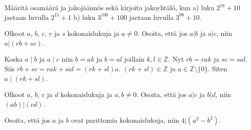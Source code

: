 \begin{tehtavasivu}
\begin{tehtava}
    \begin{vastaus}
    \end{vastaus}
\end{tehtava}

\begin{tehtava}
	Määritä osamäärä ja jakojäännös sekä kirjoita jakoyhtälö, kun a) luku $2^{18} + 10$ jaetaan luvulla $2^{15} + 1$ b) luku $3^{100} + 100$ jaetaan luvulla $3^{98} + 10$.
    \begin{vastaus}
    \end{vastaus}
\end{tehtava}

\begin{tehtava}
	Olkoot $a$, $b$, $c$, $r$ ja $s$ kokonaislukuja ja $a \neq 0$. Osoita, että jos $a|b$ ja $a|c$, niin $a|(rb + sc)$.
    \begin{vastaus}
        Koska $a\mid b$ ja $a\mid c$ niin $b = ak$ ja $b = al$ joillain $k, l \in \mathbb{Z}$. Nyt $rb = rak$ ja $sc = sal$. Siis $rb +sc = rak + sal = (rk + sl)a$. $(rk +sl) \in \mathbb{Z}$ ja $a\in \mathbb{Z}\setminus \lbrace 0 \rbrace$. Siten $a\mid(rk+sl)$. 
    \end{vastaus}
\end{tehtava}

\begin{tehtava}
	Olkoot $a$, $b$, $c$ ja $d$ kokonaislukuja ja $a, b \neq 0$. Osoita, että jos $a|c$ ja $b|d$, niin $(ab)|(cd)$.
\end{tehtava}

\begin{tehtava}
	Osoita, että jos $a$ ja $b$ ovat parittomia kokonaislukuja, niin $4 | (a^2 - b^2)$.
\end{tehtava}


\end{tehtavasivu}
